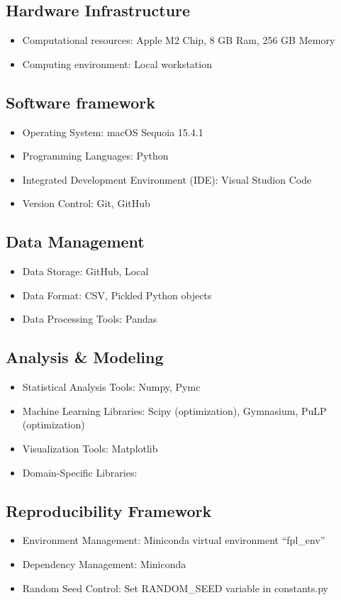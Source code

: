 \subsection{Hardware Infrastructure}

\begin{itemize}
    \item Computational resources: Apple M2 Chip, 8 GB Ram, 256 GB Memory
    \item Computing environment: Local workstation
\end{itemize}

\subsection{Software framework}
\begin{itemize}
    \item Operating System: macOS Sequoia 15.4.1
    \item Programming Languages: Python
    \item Integrated Development Environment (IDE): Visual Studion Code
    \item Version Control: Git, GitHub
\end{itemize}

\subsection{Data Management}
\begin{itemize}
    \item Data Storage: GitHub, Local
    \item Data Format: CSV, Pickled Python objects
    \item Data Processing Tools: Pandas
\end{itemize}

\subsection{Analysis \& Modeling}
\begin{itemize}
    \item Statistical Analysis Tools: Numpy, Pymc
    \item Machine Learning Libraries: Scipy (optimization), Gymnasium, PuLP \\(optimization)
    \item Visualization Tools: Matplotlib
    \item Domain-Specific Libraries: \href{https://fpl.readthedocs.io/en/latest/}{} \cite{macLeod2019}
\end{itemize}

\subsection{Reproducibility Framework}
\begin{itemize}
    \item Environment Management: Miniconda virtual environment ``fpl\_env''
    \item Dependency Management: Miniconda 
    \item Random Seed Control: Set RANDOM\_SEED variable in constants.py
\end{itemize}

